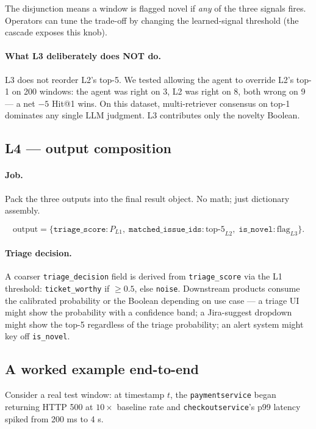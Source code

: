 The disjunction means a window is flagged novel if \emph{any} of the three signals fires. Operators can tune the trade-off by changing the learned-signal threshold (the cascade exposes this knob).

\paragraph{What L3 deliberately does NOT do.} L3 does not reorder L2's top-5. We tested allowing the agent to override L2's top-1 on 200 windows: the agent was right on 3, L2 was right on 8, both wrong on 9 --- a net $-5$ Hit@1 wins. On this dataset, multi-retriever consensus on top-1 dominates any single LLM judgment. L3 contributes only the novelty Boolean.

\subsection{L4 --- output composition}

\paragraph{Job.} Pack the three outputs into the final result object. No math; just dictionary assembly.

\[
\text{output} = \{\texttt{triage\_score}: P_{L1}, \;\texttt{matched\_issue\_ids}: \text{top-5}_{L2}, \;\texttt{is\_novel}: \text{flag}_{L3}\}.
\]

\paragraph{Triage decision.} A coarser \texttt{triage\_decision} field is derived from \texttt{triage\_score} via the L1 threshold: \texttt{ticket\_worthy} if $\geq 0.5$, else \texttt{noise}. Downstream products consume the calibrated probability or the Boolean depending on use case --- a triage UI might show the probability with a confidence band; a Jira-suggest dropdown might show the top-5 regardless of the triage probability; an alert system might key off \texttt{is\_novel}.

\subsection{A worked example end-to-end}

Consider a real test window: at timestamp $t$, the \texttt{paymentservice} began returning HTTP 500 at $10\times$ baseline rate and \texttt{checkoutservice}'s p99 latency spiked from 200 ms to 4 s.

